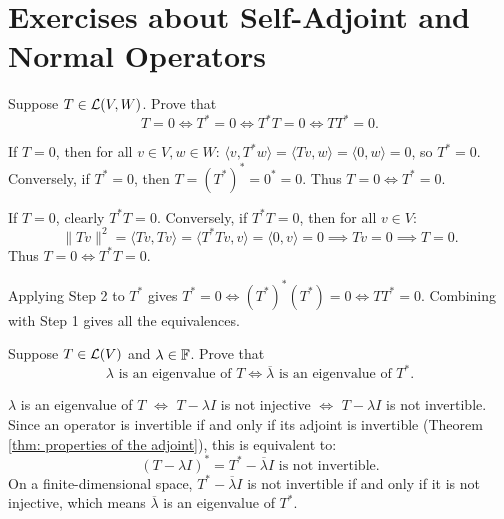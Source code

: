 \section*{Exercises about Self-Adjoint and Normal Operators}

\begin{xrcs}
  Suppose $T \in \mathcal{L}(V,W)$. Prove that
  \begin{equation}
    T = 0 \iff T^* = 0 \iff T^*T = 0 \iff TT^* = 0.
  \end{equation}

\begin{xprf}
  \StepOne If $T = 0$, then for all $v \in V, w \in W$: $\langle v, T^*w \rangle = \langle Tv, w \rangle = \langle 0, w \rangle = 0$, so $T^* = 0$.
  Conversely, if $T^* = 0$, then $T = (T^*)^* = 0^* = 0$. Thus $T = 0 \iff T^* = 0$.

  \StepTwo If $T = 0$, clearly $T^*T = 0$. Conversely, if $T^*T = 0$, then for all $v \in V$:
  \[
    \|Tv\|^2 = \langle Tv, Tv \rangle = \langle T^*Tv, v \rangle = \langle 0, v \rangle = 0 \implies Tv = 0 \implies T = 0.
  \]
  Thus $T = 0 \iff T^*T = 0$.

  \StepThree Applying Step 2 to $T^*$ gives $T^* = 0 \iff (T^*)^*(T^*) = 0 \iff TT^* = 0$.
  Combining with Step 1 gives all the equivalences.
\end{xprf}
\end{xrcs}

\begin{xrcs}
  Suppose $T \in \mathcal{L}(V)$ and $\lambda \in \mathbb{F}$. Prove that
  \begin{equation}
    \lambda \text{ is an eigenvalue of } T \iff \overline{\lambda} \text{ is an eigenvalue of } T^*.
  \end{equation}

\begin{xprf}
  $\lambda$ is an eigenvalue of $T$ $\iff$ $T - \lambda I$ is not injective $\iff$ $T - \lambda I$ is not invertible.
  Since an operator is invertible if and only if its adjoint is invertible (Theorem \ref{thm: properties of the adjoint}), this is equivalent to:
  \[
    (T - \lambda I)^* = T^* - \overline{\lambda} I \text{ is not invertible}.
  \]
  On a finite-dimensional space, $T^* - \overline{\lambda} I$ is not invertible if and only if it is not injective, which means $\overline{\lambda}$ is an eigenvalue of $T^*$.
\end{xprf}
\end{xrcs}

